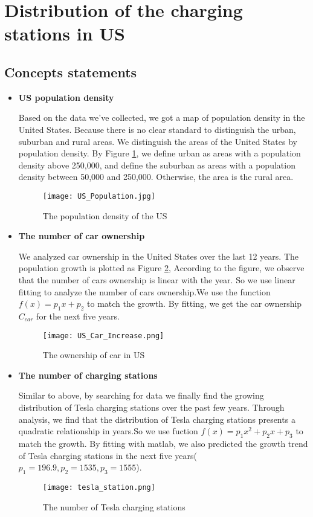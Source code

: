 \documentclass[12pt]{article}  %
\begin{document}
\section{Distribution of the charging stations in US}
\subsection{Concepts statements}
\begin{itemize}
	\item \textbf{US population density}
		
Based on the data we've collected, we got a map of population density in the United States. Because there is no clear standard to distinguish the urban, suburban and rural areas. We distinguish the areas of the United States by population density. By Figure \ref{fig:1}, we define urban as areas with a population density above 250,000, and define the suburban as areas with a population density between 50,000 and 250,000. Otherwise, the area is the rural area.
\begin{figure}[H]
	\centering
	\texttt{[image: US\_Population.jpg]}
	\caption{The population density of the US}\label{fig:1}
\end{figure}	

	\item \textbf{The number of car ownership}
	
We analyzed car ownership in the United States over the last 12 years. The population growth is plotted as Figure \ref{fig:2}, According to the figure, we observe that the number of cars ownership is linear with the year. So we use linear fitting to analyze the number of cars ownership.We use the function
$f(x) = {p_1}x + {p_2}$ to match the growth. By fitting, we get the car ownership ${C_{car}}$ for the next five years.
\begin{figure}[H]
	\centering
	\texttt{[image: US\_Car\_Increase.png]}
	\caption{The ownership of car in US}\label{fig:2}
\end{figure}

	\item \textbf{The number of charging stations}
	
Similar to above, by searching for data we finally find the growing distribution of Tesla charging stations over the past few years. Through analysis, we find that the distribution of Tesla charging stations presents a quadratic relationship in years.So we use fuction $f(x) = {p_1}{x^2} + {p_2}x + {p_3}$ to match the growth. By fitting with matlab, we also predicted the growth trend of Tesla charging stations in the next five years(${p_1=196.9, p_2=1535, p_3=1555}$).
\begin{figure}[H]
	\centering
	\texttt{[image: tesla\_station.png]}
	\caption{The number of Tesla charging stations}\label{fig:3}
\end{figure}

\end{itemize}
\end{document}
